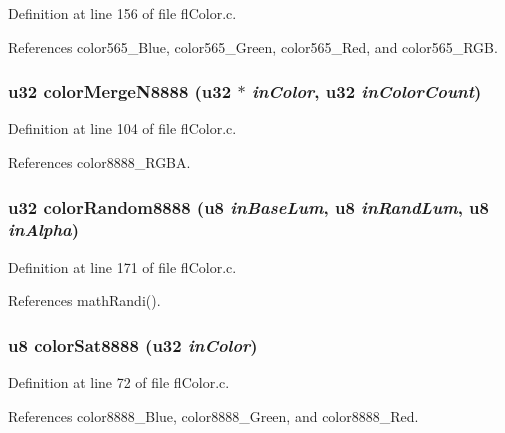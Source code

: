 Definition at line 156 of file fl\-Color.c.

References color565\_\-Blue, color565\_\-Green, color565\_\-Red, and color565\_\-RGB.
\subsubsection{\setlength{\rightskip}{0pt plus 5cm}u32 color\-Merge\-N8888 (u32 $\ast$ {\em in\-Color}, u32 {\em in\-Color\-Count})}\label{flColor_8h_b8b06e4b309e0490876e4c853ccbebcd}




Definition at line 104 of file fl\-Color.c.

References color8888\_\-RGBA.
\subsubsection{\setlength{\rightskip}{0pt plus 5cm}u32 color\-Random8888 (u8 {\em in\-Base\-Lum}, u8 {\em in\-Rand\-Lum}, u8 {\em in\-Alpha})}\label{flColor_8h_30cd44a08fded741a0764165d2062f45}




Definition at line 171 of file fl\-Color.c.

References math\-Randi().
\subsubsection{\setlength{\rightskip}{0pt plus 5cm}u8 color\-Sat8888 (u32 {\em in\-Color})}\label{flColor_8h_7c525628b898faa9a99e217c0232c4d7}




Definition at line 72 of file fl\-Color.c.

References color8888\_\-Blue, color8888\_\-Green, and color8888\_\-Red.
